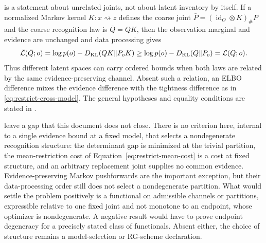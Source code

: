  is a statement about unrelated joints, not about latent
inventory by itself. If a normalized Markov kernel \(K:x\rightsquigarrow z\)
defines the coarse joint
\(\bar P=(\operatorname{id}_{O}\otimes K)_{\#}P\) and the coarse recognition
law is \(\bar Q=QK\), then the observation marginal and evidence are unchanged
and data processing gives
\[
\bar{\mathcal L}(\bar Q;o)
=\log p(o)-D_{\mathrm{KL}}(QK\Vert P_oK)
\geq\log p(o)-D_{\mathrm{KL}}(Q\Vert P_o)
=\mathcal L(Q;o).
\]
Thus different latent spaces can carry ordered bounds when both laws are
related by the same evidence-preserving channel. Absent such a relation, an
ELBO difference mixes the evidence difference with the tightness difference
as in \eqref{eq:restrict-cross-model}. The general hypotheses and equality
conditions are stated in . 

 leave a gap that this document does not close.
There is no criterion here, internal to a single evidence bound at a fixed
model, that selects a nondegenerate recognition structure: the determinant
gap is minimized at the trivial partition, the mean-restriction cost of
Equation~\eqref{eq:restrict-mean-cost} is a cost at fixed structure, and an
arbitrary replacement joint supplies no common evidence. Evidence-preserving
Markov pushforwards are the important exception, but their data-processing
order still does not select a nondegenerate partition. What would settle the
problem positively is a functional on admissible channels or partitions,
expressible relative to one fixed joint and not monotone to an endpoint, whose
optimizer is nondegenerate. A negative result would have to prove endpoint
degeneracy for a precisely stated class of functionals. Absent either, the
choice of structure remains a model-selection or RG-scheme declaration.
